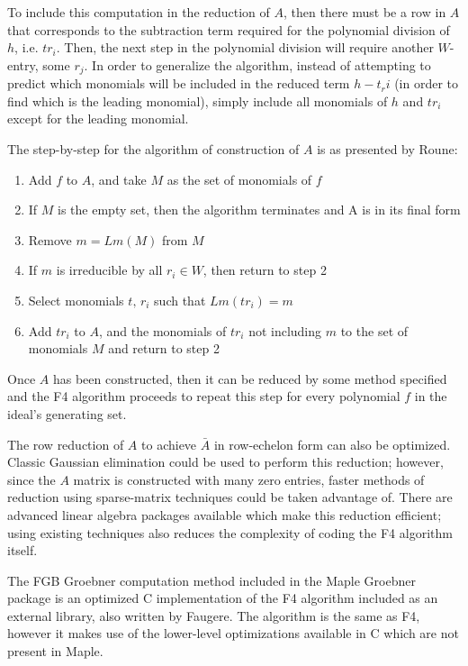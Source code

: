 \documentclass[letterpaper,12pt,titlepage,oneside,final]{book}
\begin{document}
To include this computation in the reduction of ${A}$, then there must be a row in ${A}$ that corresponds to the subtraction term required for the polynomial division of ${h}$, i.e. ${tr_i}$.  Then, the next step in the polynomial division will require another ${W}$-entry, some ${r_j}$.  In order to generalize the algorithm, instead of attempting to predict which monomials will be included in the reduced term ${h - t_ri}$ (in order to find which is the leading monomial), simply include all monomials of ${h}$ and ${tr_i}$ except for the leading monomial.

The step-by-step for the algorithm of construction of ${A}$ is as presented by Roune:
\begin{enumerate}
  \item Add ${f}$ to ${A}$, and take ${M}$ as the set of monomials of ${f}$
  \item If ${M}$ is the empty set, then the algorithm terminates and A is in its final form
  \item Remove $m = {Lm(M)}$ from ${M}$
  \item If ${m}$ is irreducible by all ${r_i \in W}$, then return to step 2
  \item Select monomials ${t,\, r_i}$ such that ${Lm(tr_i) = m}$
  \item Add ${tr_i}$ to ${A}$, and the monomials of ${tr_i}$ not including ${m}$ to the set of monomials ${M}$ and return to step 2
\end{enumerate}

Once ${A}$ has been constructed, then it can be reduced by some method specified and the F4 algorithm proceeds to repeat this step for every polynomial ${f}$ in the ideal's generating set.

The row reduction of ${A}$ to achieve ${\bar A}$ in row-echelon form can also be optimized.  Classic Gaussian elimination could be used to perform this reduction; however, since the ${A}$ matrix is constructed with many zero entries, faster methods of reduction using sparse-matrix techniques could be taken advantage of.  There are advanced linear algebra packages available which make this reduction efficient; using existing techniques also reduces the complexity of coding the F4 algorithm itself.

The FGB Groebner computation method included in the Maple Groebner package is an optimized C implementation of the F4 algorithm included as an external library, also written by Faugere.  The algorithm is the same as F4, however it makes use of the lower-level optimizations available in C which are not present in Maple.     
 
\end{document}
